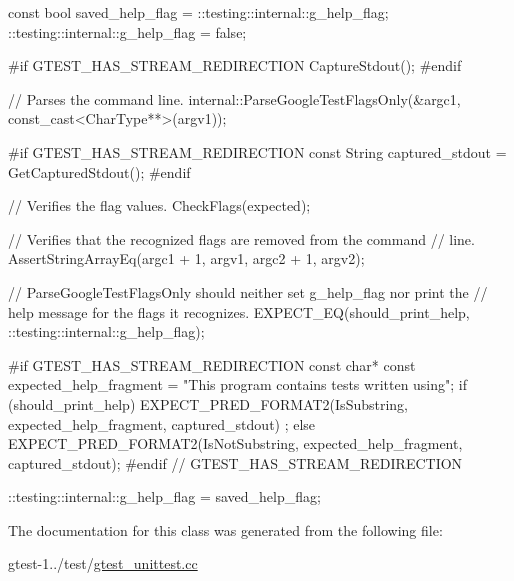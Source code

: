 \begin{DoxyCode}
                                                                              {
    const bool saved_help_flag = ::testing::internal::g_help_flag;
    ::testing::internal::g_help_flag = false;

#if GTEST_HAS_STREAM_REDIRECTION
    CaptureStdout();
#endif

    // Parses the command line.
    internal::ParseGoogleTestFlagsOnly(&argc1, const_cast<CharType**>(argv1));

#if GTEST_HAS_STREAM_REDIRECTION
    const String captured_stdout = GetCapturedStdout();
#endif

    // Verifies the flag values.
    CheckFlags(expected);

    // Verifies that the recognized flags are removed from the command
    // line.
    AssertStringArrayEq(argc1 + 1, argv1, argc2 + 1, argv2);

    // ParseGoogleTestFlagsOnly should neither set g_help_flag nor print the
    // help message for the flags it recognizes.
    EXPECT_EQ(should_print_help, ::testing::internal::g_help_flag);

#if GTEST_HAS_STREAM_REDIRECTION
    const char* const expected_help_fragment =
        "This program contains tests written using";
    if (should_print_help) {
      EXPECT_PRED_FORMAT2(IsSubstring, expected_help_fragment, captured_stdout)
      ;
    } else {
      EXPECT_PRED_FORMAT2(IsNotSubstring,
                          expected_help_fragment, captured_stdout);
    }
#endif  // GTEST_HAS_STREAM_REDIRECTION

    ::testing::internal::g_help_flag = saved_help_flag;
  }
\end{DoxyCode}


\-The documentation for this class was generated from the following file\-:\begin{DoxyCompactItemize}
\item 
gtest-\/1../test/\hyperlink{gtest__unittest_8cc}{gtest\-\_\-unittest.\-cc}\end{DoxyCompactItemize}
